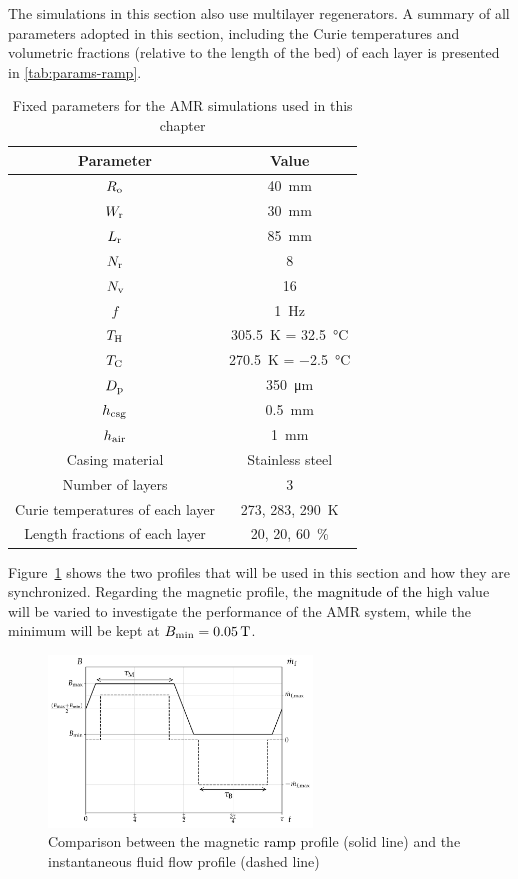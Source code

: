 \documentclass[referee]{svjour3}
\newcommand{\bmin}{\ensuremath{{B}\ped{min}}}
\begin{document}
The simulations in this section also use multilayer regenerators. A summary of all parameters adopted in this section, including the Curie temperatures and volumetric fractions (relative to the length of the bed) of each layer is presented in \autoref{tab:params-ramp}.

\begin{table}[!ht]
  \centering
  \begin{tabular}{c|c}
\hline
    \textbf{Parameter} & \textbf{Value} \\
\hline
$R_{\mathrm{o}}$ & \SI{40}{\mm} \\
$W_{\mathrm{r}}$ & \SI{30}{\mm} \\
$L_{\mathrm{r}}$ & \SI{85}{\mm} \\
$N_{\mathrm{r}}$ & \num{8} \\
$N_{\mathrm{v}}$ & \num{16} \\
$f$ & \SI{1}{\hertz} \\
$T_{\mathrm{H}}$ & \SI{305.5}{\kelvin} = \SI{32.5}{\celsius} \\
$T_{\mathrm{C}}$ & \SI{270.5}{\kelvin} = \SI{-2.5}{\celsius} \\
$D_{\mathrm{p}}$ & \SI{350}{\micro\meter} \\
$h_{\mathrm{csg}}$ & \SI{0.5}{\mm} \\
$h_{\mathrm{air}}$ & \SI{1}{\mm} \\
Casing material & Stainless steel \\
Number of layers & \num{3} \\
Curie temperatures of each layer & \num{273}, \num{283}, \SI{290}{\kelvin} \\ 
Length fractions of each layer & \num{20}, \num{20}, \SI{60}{\percent}\\
\hline
  \end{tabular}
  \caption{Fixed parameters for the AMR simulations used in this chapter}
  \label{tab:params-ramp}
\end{table}

 Figure~\ref{fig:ramp-inst} shows the two profiles that will be used in this section and how they are synchronized. Regarding the magnetic profile, the \textcolor{black}{magnitude of the} high value will be varied to investigate the performance of the AMR system, while the minimum will be kept at $\bmin = \SI{0.05}{\tesla}$. 

\begin{figure}[!ht]
  \centering
  \includegraphics[width=7cm]{profiles_rm_and_flow_instantaneous}
  \caption{Comparison between the magnetic \textcolor{black}{ramp} profile (solid line) and the instantaneous fluid flow profile (dashed line)}
  \label{fig:ramp-inst}
\end{figure}
 
\end{document}
